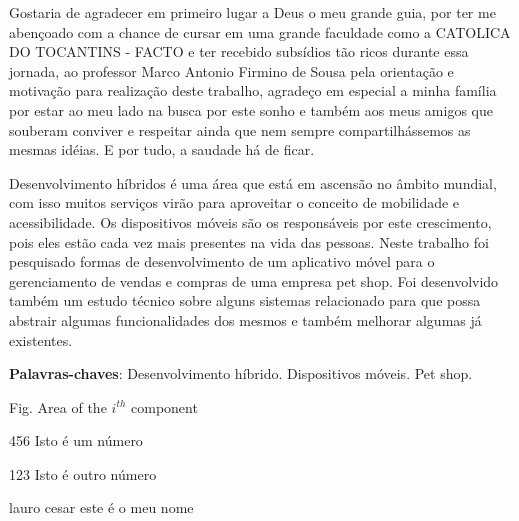 \documentclass[12pt,openright,twoside,a4paper,english,french,spanish,brazil]{abntex2}
\begin{document}
\begin{agradecimentos}
Gostaria de agradecer em primeiro lugar a Deus o meu grande guia, por ter me abençoado com a chance de cursar em uma grande faculdade como a CATOLICA DO TOCANTINS - FACTO e ter recebido subsídios tão ricos durante essa jornada, ao professor Marco Antonio Firmino de Sousa pela orientação e motivação para realização deste trabalho, agradeço em especial a minha família por estar ao meu lado na busca por este sonho e também aos meus amigos que souberam conviver e respeitar ainda que nem sempre compartilhássemos as mesmas idéias. E por tudo, a saudade há de ficar.

\end{agradecimentos}


\begin{resumo}
 Desenvolvimento híbridos é uma área que está em ascensão no âmbito mundial, com isso muitos serviços virão para aproveitar o conceito de mobilidade e acessibilidade. Os dispositivos móveis são os responsáveis por este crescimento, pois eles estão cada vez mais presentes na vida das pessoas. Neste trabalho foi pesquisado formas de desenvolvimento de um aplicativo móvel para o gerenciamento de vendas e compras de uma empresa pet shop. Foi desenvolvido também um estudo técnico sobre alguns sistemas relacionado para que possa abstrair algumas funcionalidades dos mesmos e também melhorar algumas já existentes.

 \vspace{\onelineskip}
    
 \noindent
 \textbf{Palavras-chaves}: Desenvolvimento híbrido. Dispositivos  móveis. Pet shop.
\end{resumo}


\listoffigures*
\cleardoublepage


\listoftables*
\cleardoublepage


\begin{siglas}
  \item[Fig.] Area of the $i^{th}$ component
  \item[456] Isto é um número
  \item[123] Isto é outro número
  \item[lauro cesar] este é o meu nome
\end{siglas}
\end{document}
